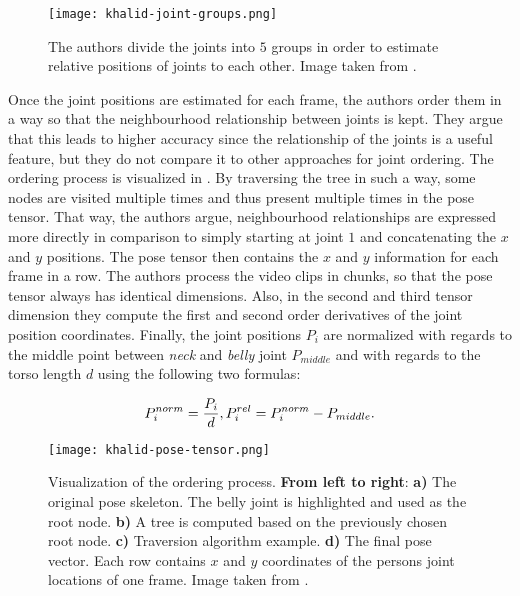 \begin{figure}[htb!]
    \centering
    \texttt{[image: khalid-joint-groups.png]}
    \caption{The authors divide the joints into $5$ groups in order to estimate relative positions of joints to each other. Image taken from \cite{khalid_multi-modal_2018}. }
    \label{fig:khalid-joint-groups}
\end{figure}

Once the joint positions are estimated for each frame, the authors order them in a way so that the neighbourhood relationship between joints is kept.
They argue that this leads to higher accuracy since the relationship of the joints is a useful feature, but they do not compare it to other approaches for joint ordering.
The ordering process is visualized in .
By traversing the tree in such a way, some nodes are visited multiple times and thus present multiple times in the pose tensor.
That way, the authors argue, neighbourhood relationships are expressed more directly in comparison to simply starting at joint $1$ and concatenating the $x$ and $y$ positions.
The pose tensor then contains the $x$ and $y$ information for each frame in a row.
The authors process the video clips in chunks, so that the pose tensor always has identical dimensions.
Also, in the second and third tensor dimension they compute the first and second order derivatives of the joint position coordinates.
Finally, the joint positions $P_i$ are normalized with regards to the middle point between \textit{neck} and \textit{belly} joint $P_{middle}$ and with regards to the torso length $d$ using the following two formulas:

\begin{equation}
    P^{norm}_i = \frac{P_i}{d}, \\
    P^{rel}_i = P^{norm}_i - P_{middle}.
\end{equation}

\begin{figure}[htb!]
    \centering
    \texttt{[image: khalid-pose-tensor.png]}
    \caption{Visualization of the ordering process. \textbf{From left to right}: \textbf{a)} The original pose skeleton. The belly joint is highlighted and used as the root node. \textbf{b)} A tree is computed based on the previously chosen root node. \textbf{c)} Traversion algorithm example. \textbf{d)} The final pose vector. Each row contains $x$ and $y$ coordinates of the persons joint locations of one frame. Image taken from \cite{khalid_multi-modal_2018}. }
    \label{fig:khalid-pose-tensor}
\end{figure}

